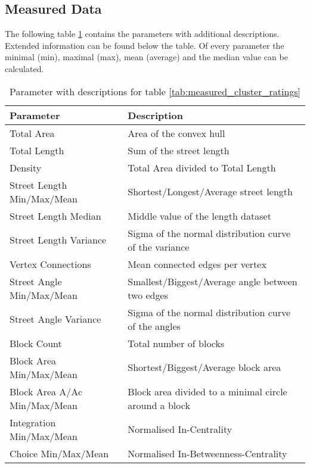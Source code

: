 \subsection{Measured Data}
\label{sec:ClusterAnalysisMeasurements}
The following table \ref{tab:cluterAnalysisDescription} contains the parameters with additional descriptions. Extended information can be found below the table. Of every parameter the minimal (min), maximal (max), mean (average) and the median value can be calculated.

\begin{table}[h]
\begin{center}
    \begin{tabular}{ | l | l |} \hline 
        Parameter & Description \\ 
        \hline
        Total Area &  Area of the convex hull \\ \hline
        Total Length & Sum of the street length \\ \hline
        Density & Total Area divided to Total Length  \\ \hline
        
        Street Length Min/Max/Mean & Shortest/Longest/Average street length  \\ \hline
        Street Length Median & Middle value of the length dataset \\ \hline
        Street Length Variance & Sigma of the normal distribution curve of the variance \\ \hline
        
        Vertex Connections & Mean connected edges per vertex  \\ \hline
        
        Street Angle Min/Max/Mean & Smallest/Biggest/Average angle between two edges \\ \hline
        Street Angle Variance & Sigma of the normal distribution curve of the angles \\ \hline
        
        Block Count & Total number of blocks \\ \hline
        Block Area Min/Max/Mean & Shortest/Biggest/Average block area \\ \hline
        Block Area A/Ac Min/Max/Mean & Block area divided to a minimal circle around a block \\ \hline
        
        Integration Min/Max/Mean & Normalised In-Centrality \\ \hline
        Choice Min/Max/Mean & Normalised In-Betweenness-Centrality \\ \hline
    \end{tabular}
    \caption{Parameter with descriptions for table \ref{tab:measured_cluster_ratings}}
    \label{tab:cluterAnalysisDescription}
\end{center}
\end{table}

